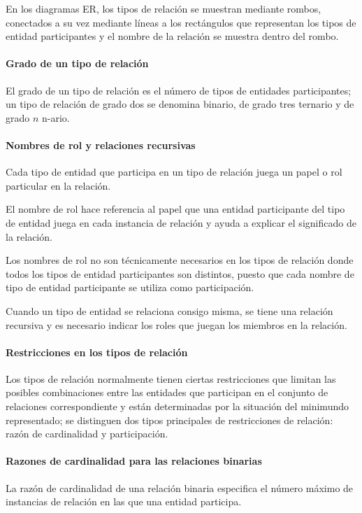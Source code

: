 En los diagramas ER, los tipos de relación se muestran mediante rombos, conectados a su vez mediante líneas a los rectángulos que representan los tipos de entidad participantes y el nombre de la relación se muestra dentro del rombo.


\paragraph*{Grado de un tipo de relación}
El grado de un tipo de relación es el número de tipos de entidades participantes; un tipo de relación de grado dos se denomina binario, de grado tres ternario y de grado $n$ n-ario. 

\paragraph*{Nombres de rol y relaciones recursivas}
Cada tipo de entidad que participa en un tipo de relación juega un papel o rol particular en la relación.


El nombre de rol hace referencia al papel que una entidad participante del tipo de entidad juega en cada instancia de relación y ayuda a explicar el significado de la relación.


Los nombres de rol no son técnicamente necesarios en los tipos de relación donde todos los tipos de entidad participantes son distintos, puesto que cada nombre de tipo de entidad participante se utiliza como participación.

Cuando un tipo de entidad se relaciona consigo misma, se tiene una relación recursiva y es necesario indicar los roles que juegan los miembros en la relación.


\paragraph*{Restricciones en los tipos de relación}


Los tipos de relación normalmente tienen ciertas restricciones que limitan las posibles combinaciones entre las entidades que participan en el conjunto de relaciones correspondiente y están determinadas por la situación del minimundo representado; se distinguen dos tipos principales de restricciones de relación: razón de cardinalidad y participación.


\paragraph*{Razones de cardinalidad para las relaciones binarias}
La razón de cardinalidad de una relación binaria especifica el número máximo de instancias de relación en las que una entidad participa.


